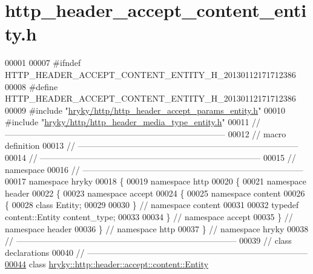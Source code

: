\hypertarget{http__header__accept__content__entity_8h_source}{\section{http\-\_\-header\-\_\-accept\-\_\-content\-\_\-entity.\-h}
}

\begin{DoxyCode}
00001 
00007 \textcolor{preprocessor}{#ifndef HTTP\_HEADER\_ACCEPT\_CONTENT\_ENTITY\_H\_20130112171712386}
00008 \textcolor{preprocessor}{}\textcolor{preprocessor}{#define HTTP\_HEADER\_ACCEPT\_CONTENT\_ENTITY\_H\_20130112171712386}
00009 \textcolor{preprocessor}{}\textcolor{preprocessor}{#include "\hyperlink{http__header__accept__params__entity_8h}{hryky/http/http_header_accept_params_entity.h}"}
00010 \textcolor{preprocessor}{#include "\hyperlink{http__header__media__type__entity_8h}{hryky/http/http_header_media_type_entity.h}"}
00011 \textcolor{comment}{//
      ------------------------------------------------------------------------------}
00012 \textcolor{comment}{// macro definition}
00013 \textcolor{comment}{//
      ------------------------------------------------------------------------------}
00014 \textcolor{comment}{//
      ------------------------------------------------------------------------------}
00015 \textcolor{comment}{// namespace}
00016 \textcolor{comment}{//
      ------------------------------------------------------------------------------}
00017 \textcolor{keyword}{namespace }hryky
00018 \{
00019 \textcolor{keyword}{namespace }http
00020 \{
00021 \textcolor{keyword}{namespace }header
00022 \{
00023 \textcolor{keyword}{namespace }accept
00024 \{
00025 \textcolor{keyword}{namespace }content
00026 \{
00028     \textcolor{keyword}{class }Entity;
00029 
00030 \} \textcolor{comment}{// namespace content}
00031 
00032 \textcolor{keyword}{typedef} content::Entity content\_type;
00033 
00034 \} \textcolor{comment}{// namespace accept}
00035 \} \textcolor{comment}{// namespace header}
00036 \} \textcolor{comment}{// namespace http}
00037 \} \textcolor{comment}{// namespace hryky}
00038 \textcolor{comment}{//
      ------------------------------------------------------------------------------}
00039 \textcolor{comment}{// class declarations}
00040 \textcolor{comment}{//
      ------------------------------------------------------------------------------}
\hypertarget{http__header__accept__content__entity_8h_source_l00044}{}\hyperlink{classhryky_1_1http_1_1header_1_1accept_1_1content_1_1_entity}{00044} \textcolor{comment}{}\textcolor{keyword}{class }\hyperlink{classhryky_1_1http_1_1header_1_1accept_1_1content_1_1_entity}{hryky::http::header::accept::content::Entity}

\end{DoxyCode}
